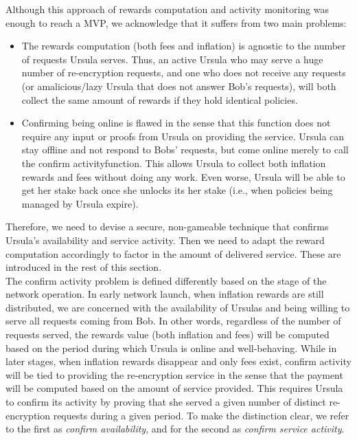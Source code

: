 \documentclass{llncs}
\begin{document}
Although this approach of rewards computation and activity monitoring was enough to reach a MVP, we acknowledge that it suffers from two main problems:
\begin{itemize}
\setlength{\itemsep}{0pt}
\item The rewards computation (both fees and inflation) is agnostic to the number of requests Ursula serves. Thus, an active Ursula who may serve a huge number of re-encryption requests, and one who does not receive any requests (or amalicious/lazy Ursula that does not answer Bob's requests), will both collect the same amount of rewards if they hold identical policies.

\item Confirming being online is flawed in the sense that this function does not require any input or proofs from Ursula on providing the service. Ursula can stay offline and not respond to Bobs' requests, but come online merely to call the confirm activityfunction. This allows Ursula to collect both inflation rewards and fees without doing any work. Even worse, Ursula will be able to get her stake back once she unlocks its her stake (i.e., when policies being managed by Ursula expire). 
\end{itemize}


Therefore, we need to devise a secure, non-gameable technique that confirms Ursula's availability and service activity. Then we need to adapt the reward computation accordingly to factor in the amount of delivered service. These are introduced in the rest of this section. \\


 The confirm activity problem is defined differently based on the stage of the network operation. In early network launch, when inflation rewards are 
still distributed, we are concerned with the availability of Ursulas and being willing to 
serve all requests coming from Bob. In other words, regardless of the number of requests served, the rewards value (both inflation and fees) will be computed based on the period during which Ursula 
is online and well-behaving. While in later stages, when inflation rewards disappear 
and only fees exist, confirm activity will be tied to providing the re-encryption 
service in the sense that the payment will be computed based on the amount of 
service provided. This requires Ursula to confirm its activity by proving that she served 
a given number of distinct re-encryption requests during a given period. To make the distinction 
clear, we refer to the first as \emph{confirm availability}, and for the second as \emph{confirm 
service activity}. \\
\end{document}
